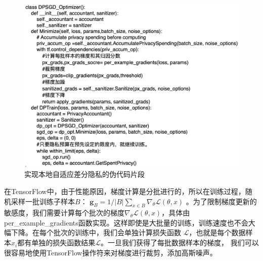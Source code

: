 \begin{figure}[!hbt]
\centering
	\includegraphics[scale=0.5]{fig2/C3/代码片段1}%
	\caption{实现本地自适应差分隐私的伪代码片段}
	\label{fig:实现本地自适应差分隐私的伪代码片段}	
\end{figure}

在TensorFlow中，由于性能原因，梯度计算是分批进行的，所以在训练过程，随机采样一批训练子样本$B$：
$\mathbf{g}_{B}=1 /|B| \sum_{x \in B} \nabla_{\theta} \mathcal{L}(\theta, x)$
。为了限制梯度更新的敏感度，我们需要计算每个批次的梯度$\nabla_{\theta} \mathcal{L}(\theta, x)$，具体由per\_example\_gradients函数实现。这样即使是大批量的训练，训练速度也不会大幅下降。在每个批次的训练中，我们会单独计算损失函数 
$\mathcal{L}$，也就是每个数据样本$x_{i}$都有单独的损失函数结果$\mathcal{L}$。一旦我们获得了每批数据样本的梯度，
我们可以很容易地使用TensorFlow操作符来对梯度进行裁剪，添加高斯噪声。

